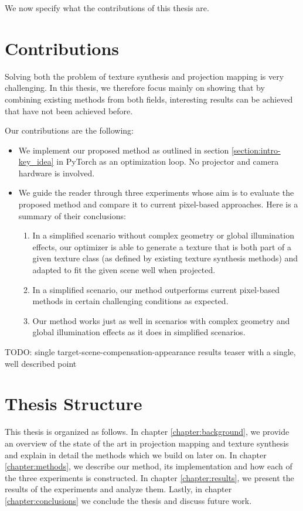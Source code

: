 We now specify what the contributions of this thesis are.

\section{Contributions}
\label{section:intro-contributions}

Solving both the problem of texture synthesis and projection mapping is very challenging. In this thesis, we therefore focus mainly on showing that by combining existing methods from both fields, interesting results can be achieved that have not been achieved before.

Our contributions are the following:

\begin{itemize}
    \item We implement our proposed method as outlined in section \ref{section:intro-key_idea} in PyTorch as an optimization loop. No projector and camera hardware is involved.
    \item We guide the reader through three experiments whose aim is to evaluate the proposed method and compare it to current pixel-based approaches. Here is a summary of their conclusions:
    \begin{enumerate}
        \item In a simplified scenario without complex geometry or global illumination effects, our optimizer is able to generate a texture that is both part of a given texture class (as defined by existing texture synthesis methods) and adapted to fit the given scene well when projected.
        \item In a simplified scenario, our method outperforms current pixel-based methods in certain challenging conditions as expected.
        \item Our method works just as well in scenarios with complex geometry and global illumination effects as it does in simplified scenarios.
    \end{enumerate}
\end{itemize}

{\color{red} TODO: single target-scene-compensation-appearance results teaser with a single, well described point}

\section{Thesis Structure}
\label{section:intro-thesis_structure}

This thesis is organized as follows. In chapter \ref{chapter:background}, we provide an overview of the state of the art in projection mapping and texture synthesis and explain in detail the methods which we build on later on. In chapter \ref{chapter:methods}, we describe our method, its implementation and how each of the three experiments is constructed. In chapter \ref{chapter:results}, we present the results of the experiments and analyze them. Lastly, in chapter \ref{chapter:conclusions} we conclude the thesis and discuss future work.
